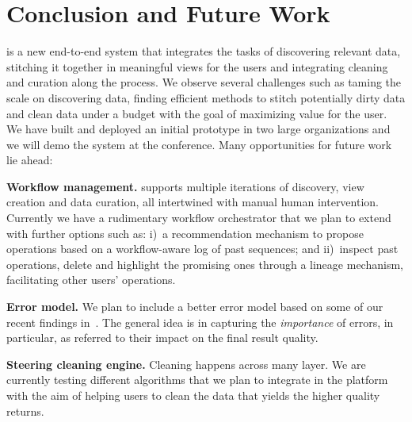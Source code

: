 \section{Conclusion and Future Work}
\label{sec:conclusion}


\dcv is a new end-to-end system that integrates the tasks of
discovering relevant data, stitching it together in meaningful views for the
users and integrating cleaning and curation along the process. We observe
several challenges such as taming the scale on discovering data, finding
efficient methods to stitch potentially dirty data and clean data under a budget
with the goal of maximizing value for the user. We have built and deployed an
initial prototype in two large organizations and we will demo the system at the
conference. Many opportunities for future work lie ahead:

\begin{myitemize}
\item\textbf{Workflow management.} \dcv supports multiple
iterations of discovery, view creation and data curation, all intertwined with
manual human intervention. Currently we have a rudimentary workflow orchestrator
that we plan to extend with further options such as: 
i)~a recommendation mechanism to propose operations based on a workflow-aware log of past sequences;
and ii)~inspect past operations, delete and highlight the promising ones through a
lineage mechanism, facilitating other users' operations. 
\item\textbf{Error model.} We plan to include a better error model based 
on some of our recent findings in~\cite{datacleaning}. 
The general idea is in capturing the \emph{importance} of
errors, in particular, as referred to their impact on the final result quality.
\item\textbf{Steering cleaning engine.} Cleaning happens across many layer. 
We are currently testing different algorithms that we plan to
integrate in the platform with the aim of helping users to
clean the data that yields the higher quality returns.
\end{myitemize}

